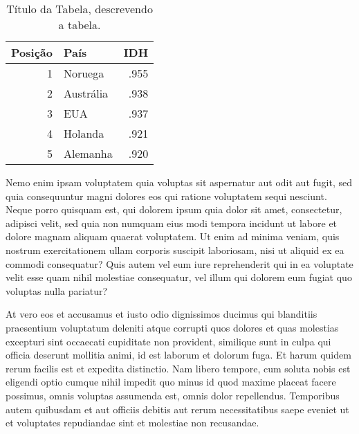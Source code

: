 \begin{table}[ht]
\centering
\caption{Título da Tabela, descrevendo a tabela.}
\vspace{0.5cm}
\begin{tabular}{r|lr}
 
Posição & País & IDH \\
\hline
1 & Noruega        & .955 \\
2 & Austrália  & .938 \\
3 & EUA            & .937 \\
4 & Holanda        & .921 \\
5 & Alemanha       & .920 
 
\end{tabular}
\label{tab:tabela1}
\end{table}

Nemo enim ipsam voluptatem quia voluptas sit aspernatur aut odit aut fugit, sed quia consequuntur magni dolores eos qui ratione voluptatem sequi nesciunt. Neque porro quisquam est, qui dolorem ipsum quia dolor sit amet, consectetur, adipisci velit, sed quia non numquam eius modi tempora incidunt ut labore et dolore magnam aliquam quaerat voluptatem. Ut enim ad minima veniam, quis nostrum exercitationem ullam corporis suscipit laboriosam, nisi ut aliquid ex ea commodi consequatur? Quis autem vel eum iure reprehenderit qui in ea voluptate velit esse quam nihil molestiae consequatur, vel illum qui dolorem eum fugiat quo voluptas nulla pariatur?

At vero eos et accusamus et iusto odio dignissimos ducimus qui blanditiis praesentium voluptatum deleniti atque corrupti quos dolores et quas molestias excepturi sint occaecati cupiditate non provident, similique sunt in culpa qui officia deserunt mollitia animi, id est laborum et dolorum fuga. Et harum quidem rerum facilis est et expedita distinctio. Nam libero tempore, cum soluta nobis est eligendi optio cumque nihil impedit quo minus id quod maxime placeat facere possimus, omnis voluptas assumenda est, omnis dolor repellendus. Temporibus autem quibusdam et aut officiis debitis aut rerum necessitatibus saepe eveniet ut et voluptates repudiandae sint et molestiae non recusandae.
